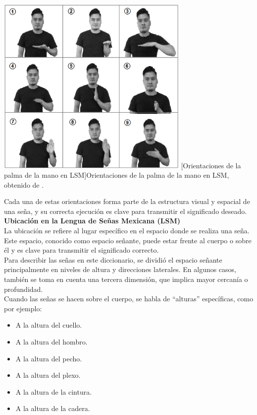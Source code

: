 \begin{center}
    \includegraphics[width=0.7\textwidth]{Images/Cap 2/Orientacion_Palma_Mano.png}
    [Orientaciones de la palma de la mano en LSM]{Orientaciones de la palma de la mano en LSM, obtenido de \cite{ref37}.}  %
\end{center}

Cada una de estas orientaciones forma parte de la estructura visual y espacial de una seña, y su correcta ejecución es clave para transmitir el significado deseado.\\

\textbf{Ubicación en la Lengua de Señas Mexicana (LSM)}\\
La ubicación se refiere al lugar específico en el espacio donde se realiza una seña. Este espacio, conocido como espacio señante, puede estar frente al cuerpo o sobre él y es clave para transmitir el significado correcto.\\

Para describir las señas en este diccionario, se dividió el espacio señante principalmente en niveles de altura y direcciones laterales. En algunos casos, también se toma en cuenta una tercera dimensión, que implica mayor cercanía o profundidad.\\

Cuando las señas se hacen sobre el cuerpo, se habla de “alturas” específicas, como por ejemplo:
\begin{itemize}
    \item A la altura del cuello.
    \item A la altura del hombro.
    \item A la altura del pecho.
    \item A la altura del plexo.
    \item A la altura de la cintura.
    \item A la altura de la cadera.
\end{itemize}

